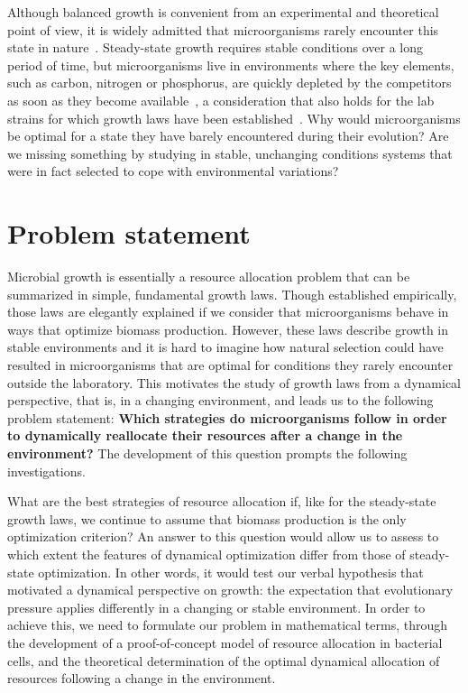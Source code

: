 Although balanced growth is convenient from an experimental and theoretical point of view, it is widely admitted that microorganisms rarely encounter this state in nature~\cite{schaechter_microbe_2006}.
Steady-state growth requires stable conditions over a long period of time, but microorganisms live in
environments where the key elements, such as carbon, nitrogen or phosphorus, are quickly depleted by the competitors as soon as they become available~\cite{mcarthur_microbial_2006,menge_nitrogen_2012,hobbie_microbes_2013}, a consideration that also holds for the lab strains for which growth laws have been established~\cite{savageau_escherichia_1983,savageau_demand_1998,blount_unexhausted_2015,vanelsas_survival_2011}.
Why would microorganisms be optimal for a state they have barely encountered during their evolution?
Are we missing something by studying in stable, unchanging conditions systems that were in fact selected to cope with environmental variations?

\section{Problem statement}
\label{sec:problemstatement}

Microbial growth is essentially a resource allocation problem that can be summarized in simple, fundamental growth laws.
Though established empirically, those laws are elegantly explained if we consider that microorganisms behave in ways that optimize biomass production.
However, these laws describe growth in stable environments and it is hard to imagine how natural selection could have resulted in microorganisms that are optimal for conditions they rarely encounter outside the laboratory.
This motivates the study of growth laws from a dynamical perspective, that is, in a changing environment, and leads us to the following problem statement: \textbf{Which strategies do microorganisms follow in order to dynamically reallocate their resources after a change in the environment?}
The development of this question prompts the following investigations.

What are the best strategies of resource allocation if, like for the steady-state growth laws, we continue to assume that biomass production is the only optimization criterion?
An answer to this question would allow us to assess to which extent the features of dynamical optimization differ from those of steady-state optimization.
In other words, it would test our verbal hypothesis that motivated a dynamical perspective on growth: the expectation that evolutionary pressure applies differently in a changing or stable environment.
In order to achieve this, we need to formulate our problem in mathematical terms, through the development of a proof-of-concept model of resource allocation in bacterial cells, and the theoretical determination of the optimal dynamical allocation of resources following a change in the environment.

